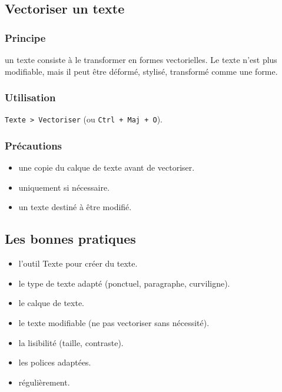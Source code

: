 \subsection{Vectoriser un texte}

\subsubsection{Principe}

 un texte consiste à le transformer en formes vectorielles. Le texte n'est plus modifiable, mais il peut être déformé, stylisé, transformé comme une forme.

\subsubsection{Utilisation}

\texttt{Texte > Vectoriser} (ou \texttt{Ctrl + Maj + O}).

\subsubsection{Précautions}

\begin{itemize}
    \item {} une copie du calque de texte avant de vectoriser.
    \item {} uniquement si nécessaire.
    \item {} un texte destiné à être modifié.
\end{itemize}

\subsection{Les bonnes pratiques}

\begin{itemize}
    \item {} l'outil Texte pour créer du texte.
    \item {} le type de texte adapté (ponctuel, paragraphe, curviligne).
    \item {} le calque de texte.
    \item {} le texte modifiable (ne pas vectoriser sans nécessité).
    \item {} la lisibilité (taille, contraste).
    \item {} les polices adaptées.
    \item {} régulièrement.
\end{itemize}

